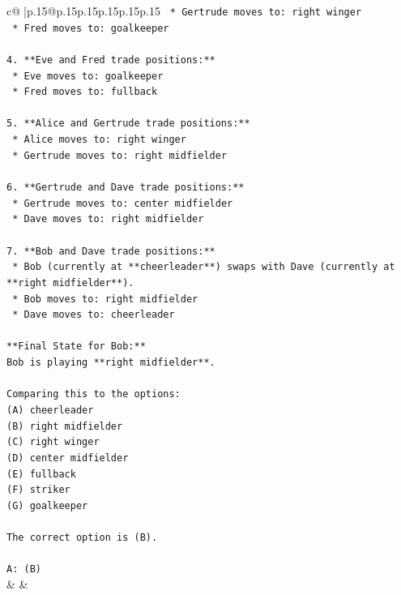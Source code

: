 \documentclass{article}
\begin{document}
{\begin{supertabular}{c@{$\;$}|p{.15\linewidth}@{}p{.15\linewidth}p{.15\linewidth}p{.15\linewidth}p{.15\linewidth}p{.15\linewidth}}
{{{\texttt{    *   Gertrude moves to: right winger} \\
\texttt{    *   Fred moves to: goalkeeper} \\
\\ 
\texttt{4.  **Eve and Fred trade positions:**} \\
\texttt{    *   Eve moves to: goalkeeper} \\
\texttt{    *   Fred moves to: fullback} \\
\\ 
\texttt{5.  **Alice and Gertrude trade positions:**} \\
\texttt{    *   Alice moves to: right winger} \\
\texttt{    *   Gertrude moves to: right midfielder} \\
\\ 
\texttt{6.  **Gertrude and Dave trade positions:**} \\
\texttt{    *   Gertrude moves to: center midfielder} \\
\texttt{    *   Dave moves to: right midfielder} \\
\\ 
\texttt{7.  **Bob and Dave trade positions:**} \\
\texttt{    *   Bob (currently at **cheerleader**) swaps with Dave (currently at **right midfielder**).} \\
\texttt{    *   Bob moves to: right midfielder} \\
\texttt{    *   Dave moves to: cheerleader} \\
\\ 
\texttt{**Final State for Bob:**} \\
\texttt{Bob is playing **right midfielder**.} \\
\\ 
\texttt{Comparing this to the options:} \\
\texttt{(A) cheerleader} \\
\texttt{(B) right midfielder} \\
\texttt{(C) right winger} \\
\texttt{(D) center midfielder} \\
\texttt{(E) fullback} \\
\texttt{(F) striker} \\
\texttt{(G) goalkeeper} \\
\\ 
\texttt{The correct option is (B).} \\
\\ 
\texttt{A: (B)} \\
            }
        }
    }
    & & \\ \\


\end{supertabular}}
\end{document}
